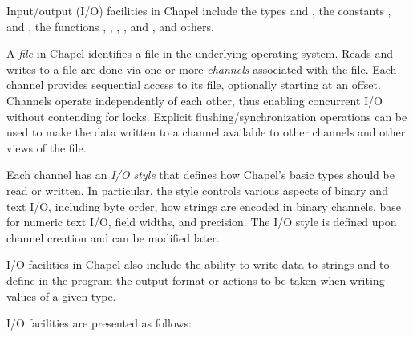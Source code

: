 \label{Input_and_Output}

Input/output (I/O) facilities in Chapel include
the types  and ,
the constants ,  and ,
the functions , , , ,
 and ,
and others.

A \emph{file} in Chapel identifies a file in the underlying operating system.
%
Reads and writes to a file are done via one or more \emph{channels}
associated with the file.
Each channel provides sequential access to its file, optionally
starting at an offset. Channels operate independently of each other,
thus enabling concurrent I/O without contending for locks.
%
Explicit flushing/synchronization operations can be used
to make the data written to a channel available to other channels
and other views of the file.

Each channel has an \emph{I/O style} that defines
how Chapel's basic types should be read or written.
In particular, the style controls various aspects of binary and text I/O,
including byte order, how strings are encoded in binary channels, base
for numeric text I/O, field widths, and precision.
The I/O style is defined upon channel creation and can be modified later.

I/O facilities in Chapel also include the ability to write data
to strings and to define in the program the output format or actions
to be taken when writing values of a given type.

I/O facilities are presented as follows:

